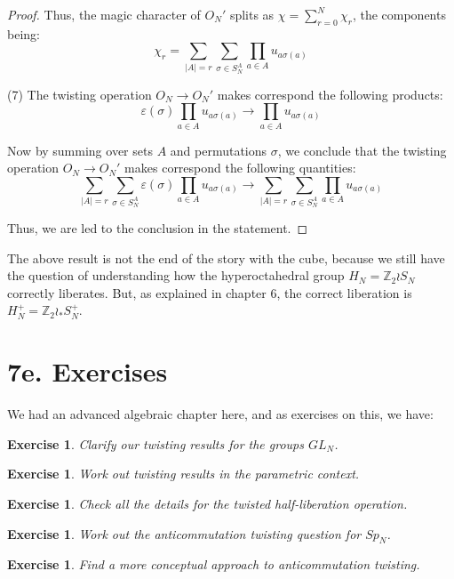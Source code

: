 \documentclass[12pt]{amsbook}
\newtheorem{exercise}[theorem]{Exercise}
\begin{document}
\begin{proof}
Thus, the magic character of $O_N'$ splits as $\chi=\sum_{r=0}^N\chi_r$, the components being:
$$\chi_r=\sum_{|A|=r}\sum_{\sigma\in S_N^A}\prod_{a\in A}u_{a\sigma(a)}$$

(7) The twisting operation $O_N\to O_N'$ makes correspond the following products:
$$\varepsilon(\sigma)\prod_{a\in A}u_{a\sigma(a)}\to\prod_{a\in A}u_{a\sigma(a)}$$

Now by summing over sets $A$ and permutations $\sigma$, we conclude that the twisting operation $O_N\to O_N'$ makes correspond the following quantities:
$$\sum_{|A|=r}\sum_{\sigma\in S_N^A}\varepsilon(\sigma)\prod_{a\in A}u_{a\sigma(a)}\to \sum_{|A|=r}\sum_{\sigma\in S_N^A}\prod_{a\in A}u_{a\sigma(a)}$$

Thus, we are led to the conclusion in the statement.
\end{proof}

The above result is not the end of the story with the cube, because we still have the question of understanding how the hyperoctahedral group $H_N=\mathbb Z_2\wr S_N$ correctly liberates. But, as explained in chapter 6, the correct liberation is $H_N^+=\mathbb Z_2\wr_*S_N^+$.

\section*{7e. Exercises}

We had an advanced algebraic chapter here, and as exercises on this, we have:

\begin{exercise}
Clarify our twisting results for the groups $GL_N$.
\end{exercise}

\begin{exercise}
Work out twisting results in the parametric context.
\end{exercise}

\begin{exercise}
Check all the details for the twisted half-liberation operation.
\end{exercise}

\begin{exercise}
Work out the anticommutation twisting question for $Sp_N$.
\end{exercise}

\begin{exercise}
Find a more conceptual approach to anticommutation twisting.
\end{exercise}
\end{document}
